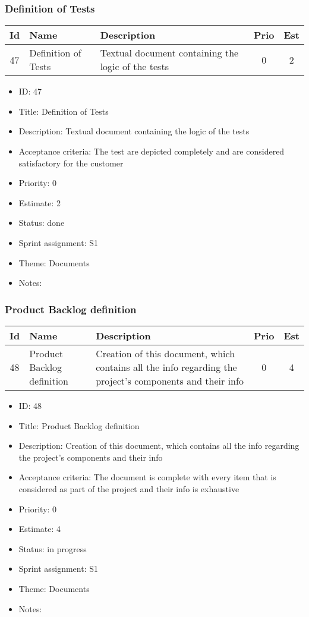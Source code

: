 \newpage
\subsubsection{Definition of Tests}
\begin{tabular}{|c|m{1.5cm}|m{4cm}|c|c|}
	\hline
	\textbf{Id}&\textbf{Name}&\textbf{Description}&\textbf{Prio}&\textbf{Est}\\
	\hline
	47 & Definition of Tests & 
	Textual document containing the logic of the tests &
	0 & 2 \\
	\hline
\end{tabular}
\begin{itemize}
	\item ID: 47
	\item Title: Definition of Tests
	\item Description: Textual document containing the logic of the tests
	\item Acceptance criteria: The test are depicted completely and are considered satisfactory for the customer
	\item Priority: 0
	\item Estimate: 2
	\item Status: done
	\item Sprint assignment: S1
	\item Theme: Documents
	\item Notes:
\end{itemize}

\newpage
\subsubsection{Product Backlog definition}
\begin{tabular}{|c|m{1.5cm}|m{4cm}|c|c|}
	\hline
	\textbf{Id}&\textbf{Name}&\textbf{Description}&\textbf{Prio}&\textbf{Est}\\
	\hline
	48 & Product Backlog definition & 
	Creation of this document, which contains all the info regarding the project's components and their info &
	0 & 4 \\
	\hline
\end{tabular}
\begin{itemize}
	\item ID: 48
	\item Title: Product Backlog definition
	\item Description: Creation of this document, which contains all the info regarding the project's components and their info
	\item Acceptance criteria: The document is complete with every item that is considered as part of the project and their info is exhaustive
	\item Priority: 0
	\item Estimate: 4
	\item Status: in progress
	\item Sprint assignment: S1
	\item Theme: Documents
	\item Notes:
\end{itemize}

